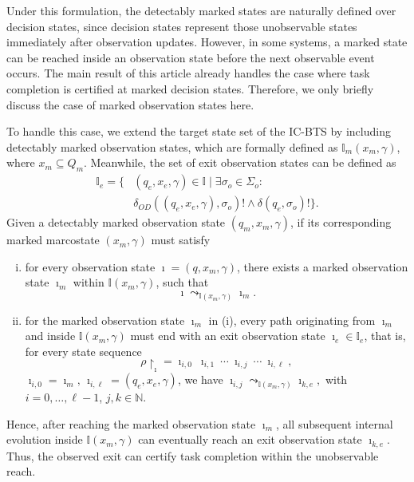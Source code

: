 \documentclass[twocolumn]{autart}
\begin{document}
Under this formulation, the detectably marked states are naturally defined over decision states, since decision states represent those unobservable states immediately after observation updates.
However, in some systems, a marked state can be reached inside an observation state before the next observable event occurs.
The main result of this article already handles the case where task completion is certified at marked decision states. Therefore, we only briefly discuss the case of marked observation states here.

To handle this case, we extend the target state set of the IC-BTS by including detectably marked observation states, which are formally defined as $\mathbb{I}_{m}(x_m, \gamma)$, where $x_{m} \subseteq Q_m$.
Meanwhile, the set of exit observation states can be defined as
$$
\begin{aligned}
    \mathbb{I}_{e} =
    \{ &(q_e, x_e, \gamma) \in \mathbb{I} \mid
    \exists \sigma_o \in \Sigma_o : \\
       &\delta_{OD}((q_e, x_e, \gamma), \sigma_o)! \wedge \delta(q_e,\sigma_o)! \}.        
\end{aligned}
$$
Given a detectably marked observation state $(q_m, x_m, \gamma)$, if its corresponding marked marcostate $(x_m, \gamma)$ must satisfy
\begin{enumerate}[(i)]
    \item for every observation state $\imath = (q, x_m, \gamma)$, there exists a marked observation state $\imath_m$ within $\mathbb{I}(x_m, \gamma)$, such that
    $$
        \imath \leadsto_{\mathbb{I}(x_m,\gamma)} \imath_m.
    $$

    \item for the marked observation state $\imath_m$ in (i), every path originating from $\imath_m$ and inside $\mathbb{I}(x_m,\gamma)$ must end with an exit observation state $\imath_e \in \mathbb{I}_{e}$, that is, for every state sequence
    $$
        \rho\restriction_{\imath} = \imath_{i,0} \ \imath_{i,1} \ \cdots \ \imath_{i,j} \ \cdots \ \imath_{i,\ell},
    $$
    $\imath_{i,0} = \imath_m, \, \imath_{i,\ell} = (q_e, x_e, \gamma)$, we have
    $
        \imath_{i,j} \leadsto_{\mathbb{I}(x_m,\gamma)} \imath_{k,e},
    $
    with $i = 0, \ldots , \ell - 1$, $j,k \in \mathbb{N}$.
\end{enumerate}
Hence, after reaching the marked observation state $\imath_m$, all subsequent internal evolution inside $\mathbb{I}(x_m,\gamma)$ can eventually reach an exit observation state $\imath_{k,e}$.
Thus, the observed exit can certify task completion within the unobservable reach.
\end{document}
